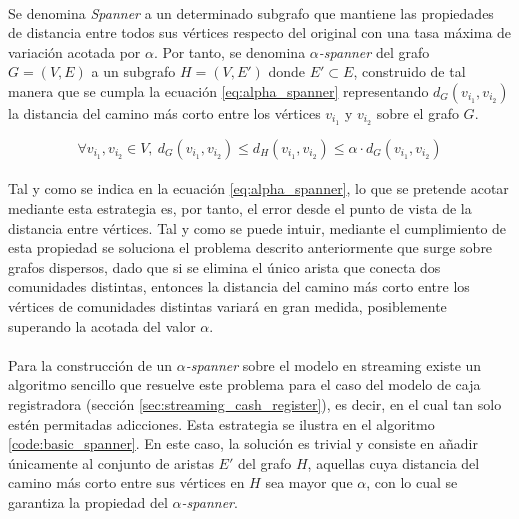 \documentclass{subfiles}
\begin{document}
        \paragraph{}
        Se denomina \emph{Spanner} a un determinado subgrafo que mantiene las propiedades de distancia entre todos sus vértices respecto del original con una tasa máxima de variación acotada por $\alpha$. Por tanto, se denomina \emph{$\alpha$-spanner} del grafo $G = (V, E)$ a un subgrafo $H = (V, E')$ donde $E' \subset E$, construido de tal manera que se cumpla la ecuación \eqref{eq:alpha_spanner} representando $d_G(v_{i_1},v_{i_2})$ la distancia del camino más corto entre los vértices $v_{i_1}$ y $v_{i_2}$ sobre el grafo $G$.

        \begin{equation}
        \label{eq:alpha_spanner}
          \forall v_{i_1}, v_{i_2} \in V, \ d_G(v_{i_1},v_{i_2}) \leq d_H(v_{i_1},v_{i_2}) \leq \alpha \cdot d_G(v_{i_1},v_{i_2})
        \end{equation}

        \paragraph{}
        Tal y como se indica en la ecuación \eqref{eq:alpha_spanner}, lo que se pretende acotar mediante esta estrategia es, por tanto, el error desde el punto de vista de la distancia entre vértices. Tal y como se puede intuir, mediante el cumplimiento de esta propiedad se soluciona el problema descrito anteriormente que surge sobre grafos dispersos, dado que si se elimina el único arista que conecta dos comunidades distintas, entonces la distancia del camino más corto entre los vértices de comunidades distintas variará en gran medida, posiblemente superando la acotada del valor $\alpha$.

        \paragraph{}
        Para la construcción de un \emph{$\alpha$-spanner} sobre el modelo en streaming existe un algoritmo sencillo que resuelve este problema para el caso del modelo de caja registradora (sección \ref{sec:streaming_cash_register}), es decir, en el cual tan solo estén permitadas adicciones. Esta estrategia se ilustra en el algoritmo \ref{code:basic_spanner}. En este caso, la solución es trivial y consiste en añadir únicamente al conjunto de aristas $E'$ del grafo $H$, aquellas cuya distancia del camino más corto entre sus vértices en $H$ sea mayor que $\alpha$, con lo cual se garantiza la propiedad del \emph{$\alpha$-spanner}.
\end{document}
